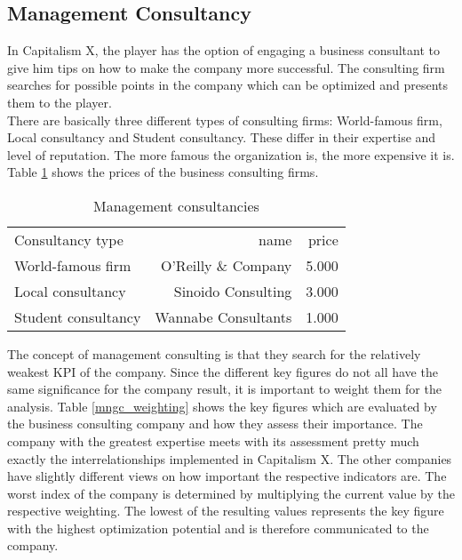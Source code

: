 \subsection{Management Consultancy} \label{management_consultancy_simulation}
In Capitalism X, the player has the option of engaging a business consultant to give him tips on how to make the company more successful. 
The consulting firm searches for possible points in the company which can be optimized and presents them to the player. \\
There are basically three different types of consulting firms: World-famous firm, Local consultancy and Student consultancy. These differ in their expertise and level of reputation. The more famous the organization is, the more expensive it is. Table \ref{mng_consultancy} shows the prices of the business consulting firms. \\

\begin{table}[ht]
\centering
\begin{tabular}{|l|r|r|}
\hline
Consultancy type        & name  & price \\
World-famous firm       & O'Reilly \& Company     & 5.000     \\
Local consultancy       & Sinoido Consulting     & 3.000     \\
Student consultancy     & Wannabe Consultants    & 1.000     \\
\hline
\end{tabular}
\caption{Management consultancies}
\label{mng_consultancy}
\end{table}

The concept of management consulting is that they search for the relatively weakest KPI of the company. Since the different key figures do not all have the same significance for the company result, it is important to weight them for the analysis.
Table \ref{mngc_weighting} shows the key figures which are evaluated by the business consulting company and how they assess their importance.
The company with the greatest expertise meets with its assessment pretty much exactly the interrelationships implemented in Capitalism X. The other companies have slightly different views on how important the respective indicators are. 
The worst index of the company is determined by multiplying the current value by the respective weighting. The lowest of the resulting values represents the key figure with the highest optimization potential and is therefore communicated to the company. 
 
